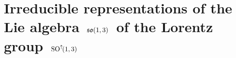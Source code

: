 

\section{Irreducible representations of the Lie algebra \,$\mathfrak{so}(1,3)$\, of the Lorentz group \,$\textnormal{SO}^{\uparrow\!}(1,3)$}
\setcounter{theorem}{0}
\setcounter{equation}{0}


\renewcommand{\theenumi}{\roman{enumi}}
\renewcommand{\labelenumi}{\textnormal{(\theenumi)}$\;\;$}




